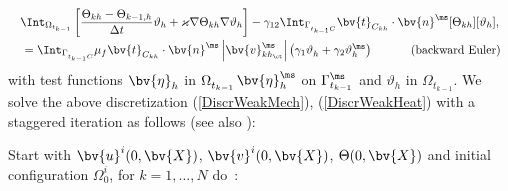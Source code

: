 \begin{equation}\label{DiscrWeakHeat}
\begin{array}{c}
\begin{array}{l}
\displaystyle\Int_{\Omega_{t_{k-1}}}\left[\frac{\Theta_{kh}-\Theta_{k-1,h}}{\Delta t} \vartheta_h  +\varkappa \nabla \Theta_{kh} \nabla \vartheta_h \right] -\gamma_{12}\Int_{\Gamma_{t_{k-1}C}^{\sl}}\bv{t}_{C_{kh}}\cdot\bv{n}^{\ms}[\Theta_{kh}][\vartheta_{h}],
\end{array}
 \\[2ex]
\begin{array}{r}
\displaystyle= \Int_{\Gamma^{\sl}_{t_{k-1}C}}\mu_f \bv{t}_{C_{kh}}\cdot\bv{n}^{\ms} \left| \bv{v}^{\ms \sl}_{kh_{\ct}}\right|\left(\gamma_1\vartheta_h^{\sl}+\gamma_2\vartheta_h^{\ms}\right)
\end{array}\mbox{\hspace*{1cm}(backward Euler)}
\end{array}
\end{equation}
with test functions   $ \bv{\eta}_h^{\sl}$ in $\Omega_{t_{k-1}}^{\sl}$\quad $ \bv{\eta}_h^{\ms}$ on $\Gamma^{\ms}_{t_{k-1}}$ and  $\vartheta_h$ in $\Omega_{t_{k-1}}$.
We solve the above discretization (\ref{DiscrWeakMech}), (\ref{DiscrWeakHeat}) with a staggered iteration as follows (see also \cite{MuChaDBE3}):

Start with $\bv{u}^i(0,\bv{X})$, $\bv{v}^{i}(0,\bv{X})$, $\Theta(0,\bv{X})$ and initial configuration $\Omega_0^i$, for   $k=1,\ldots,N$ do~:

